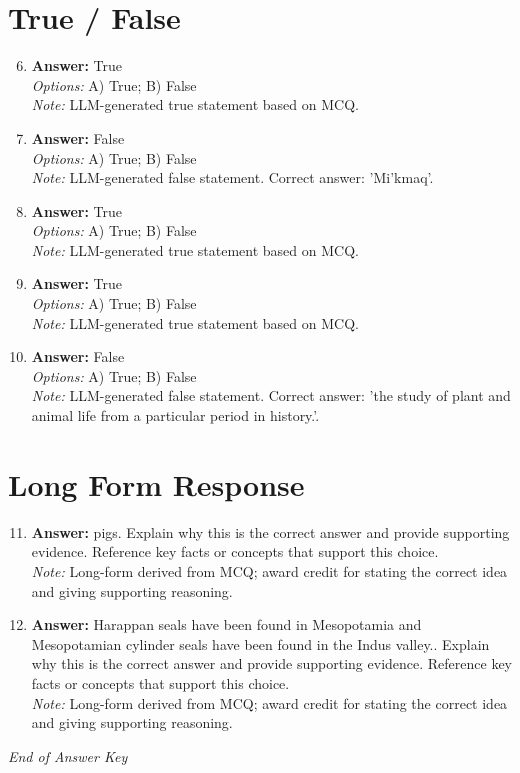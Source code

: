 \documentclass[12pt]{article}
\begin{document}
\section*{True / False}
\begin{enumerate}[label=\arabic*.]
\setcounter{enumi}{5}
\item \textbf{Answer:} True
\\ \textit{Options:} A) True; B) False
\\ \textit{Note:} LLM-generated true statement based on MCQ.
\item \textbf{Answer:} False
\\ \textit{Options:} A) True; B) False
\\ \textit{Note:} LLM-generated false statement. Correct answer: 'Mi'kmaq'.
\item \textbf{Answer:} True
\\ \textit{Options:} A) True; B) False
\\ \textit{Note:} LLM-generated true statement based on MCQ.
\item \textbf{Answer:} True
\\ \textit{Options:} A) True; B) False
\\ \textit{Note:} LLM-generated true statement based on MCQ.
\item \textbf{Answer:} False
\\ \textit{Options:} A) True; B) False
\\ \textit{Note:} LLM-generated false statement. Correct answer: 'the study of plant and animal life from a particular period in history.'.
\end{enumerate}

\section*{Long Form Response}
\begin{enumerate}[label=\arabic*.]
\setcounter{enumi}{10}
\item \textbf{Answer:} pigs. Explain why this is the correct answer and provide supporting evidence. Reference
key facts or concepts that support this choice.
\\ \textit{Note:} Long-form derived from MCQ; award credit for stating the correct idea and giving supporting reasoning.
\item \textbf{Answer:} Harappan seals have been found in Mesopotamia and Mesopotamian cylinder seals have been
found in the Indus valley.. Explain why this is the correct answer and provide supporting
evidence. Reference key facts or concepts that support this choice.
\\ \textit{Note:} Long-form derived from MCQ; award credit for stating the correct idea and giving supporting reasoning.
\end{enumerate}

\vfill
\noindent\textit{End of Answer Key}
\end{document}
